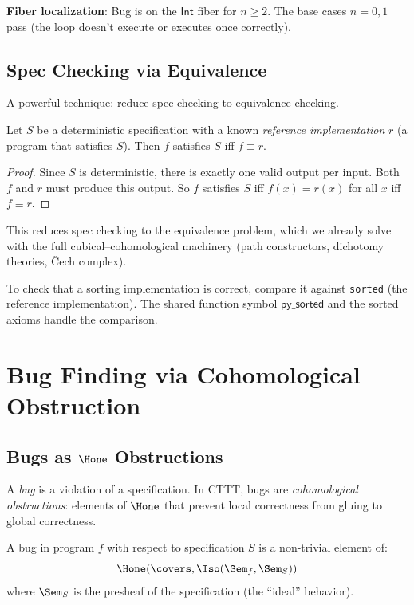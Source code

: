 \textbf{Fiber localization}: Bug is on the $\mathsf{Int}$ fiber for
$n \geq 2$.  The base cases $n = 0, 1$ pass (the loop doesn't execute
or executes once correctly).

\section{Spec Checking via Equivalence}

A powerful technique: reduce spec checking to equivalence checking.

\begin{theorem}
\label{thm:spec-as-equiv}
Let $S$ be a deterministic specification with a known \emph{reference
implementation} $r$ (a program that satisfies $S$).  Then $f$ satisfies
$S$ iff $f \equiv r$.
\end{theorem}

\begin{proof}
Since $S$ is deterministic, there is exactly one valid output per
input.  Both $f$ and $r$ must produce this output.  So $f$ satisfies
$S$ iff $f(x) = r(x)$ for all $x$ iff $f \equiv r$.
\end{proof}

This reduces spec checking to the equivalence problem, which we
already solve with the full cubical--cohomological machinery
(path constructors, dichotomy theories, \v{C}ech complex).

\begin{example}
To check that a sorting implementation is correct, compare it against
\texttt{sorted} (the reference implementation).  The shared function
symbol $\mathsf{py\_sorted}$ and the sorted axioms handle the
comparison.
\end{example}


\chapter{Bug Finding via Cohomological Obstruction}
\label{ch:bug-finding}

\section{Bugs as $\Hone$ Obstructions}

A \emph{bug} is a violation of a specification.  In CTTT, bugs are
\emph{cohomological obstructions}: elements of $\Hone$ that prevent
local correctness from gluing to global correctness.

\begin{definition}
A bug in program $f$ with respect to specification $S$ is a
non-trivial element of:
\[
  \Hone(\covers, \Iso(\Sem_f, \Sem_S))
\]
where $\Sem_S$ is the presheaf of the specification (the ``ideal''
behavior).
\end{definition}


